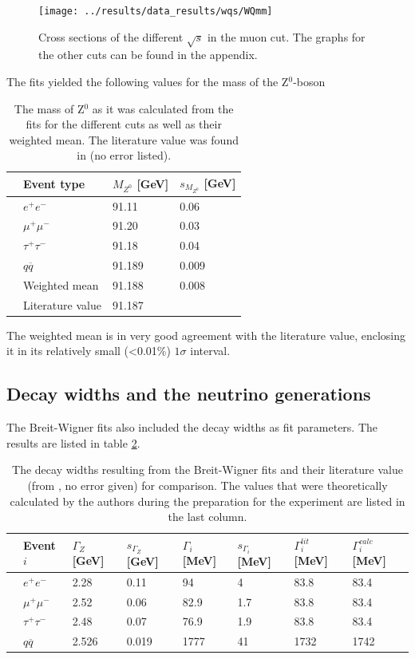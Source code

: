 \begin{figure}
\centering
\texttt{[image: ../results/data\_results/wqs/WQmm]}
\caption[Cross sections for muon cut]{Cross sections of the different $\sqrt{s}$ in the muon cut. The graphs for the other cuts can be found in the appendix.}
\label{fig:WQmm}
\end{figure}

The fits yielded the following values for the mass of the Z$^0$-boson
\begin{table}[H]\centering
	\begin{tabular}{@{}llll@{}}
		\toprule
		&Event type&$M_{Z^0}$ [GeV]&$s_{M_{Z^0}}$ [GeV]\\
		\midrule
		&$e^+e^-$&91.11&0.06\\
		&$\mu^+\mu^-$&91.20&0.03\\
		&$\tau^+\tau^-$&91.18&0.04\\
		&$q\overline{q}$&91.189&0.009\\
		\midrule
		&Weighted mean&91.188&0.008\\
		&Literature value&91.187&\\
		\bottomrule
	\end{tabular}
	\caption[Breit-Wigner fit results: $M_{Z^0}$]{The mass of Z$^0$ as it was calculated from the fits for the different cuts as well as their weighted mean. The literature value was found in \cite{muenchen} (no error listed).}
	\label{tb:Z0massfitresults}
\end{table}

The weighted mean is in very good agreement with the literature value, enclosing it in its relatively small (<0.01\%) $1\sigma$ interval.

\subsection{Decay widths and the neutrino generations}
The Breit-Wigner fits also included the decay widths as fit parameters. The results are listed in table \ref{tb:decaywidthfitresults}.  

\begin{table}[h]\centering
	\begin{tabular}{@{}llllllll@{}}
		\toprule
		&Event $i$&$\Gamma_{Z}$ [GeV]&$s_{\Gamma_{Z}}$ [GeV]&$\Gamma_i$ [MeV]&$s_{\Gamma_i}$ [MeV]&$\Gamma^{lit}_i$ [MeV]&$\Gamma^{calc}_i$ [MeV]\\
		\midrule
		&$e^+e^-$&2.28&0.11&94&4&83.8&83.4\\
		&$\mu^+\mu^-$&2.52&0.06&82.9&1.7&83.8&83.4\\
		&$\tau^+\tau^-$&2.48&0.07&76.9&1.9&83.8&83.4\\
		&$q\overline{q}$&2.526&0.019&1777&41&1732&1742\\
		\bottomrule
	\end{tabular}
	\caption[Breit-Wigner fit results: Decay widths ]{The decay widths resulting from the Breit-Wigner fits and their literature value (from \cite{staatsex}, no error given) for comparison. The values that were theoretically calculated by the authors during the preparation for the experiment are listed in the last column.}
	\label{tb:decaywidthfitresults}
\end{table}

